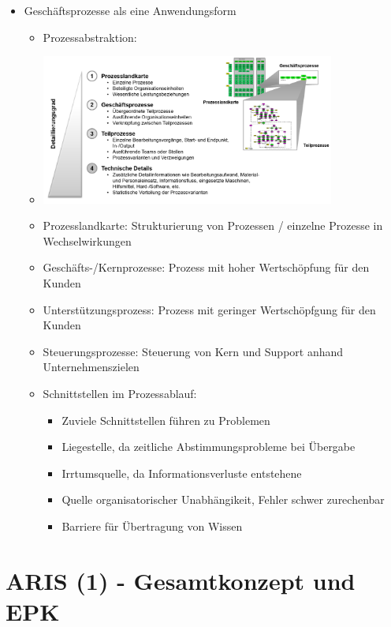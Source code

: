 \documentclass[11pt,a4paper]{article}
\begin{document}
\begin{itemize}
\item Geschäftsprozesse als eine Anwendungsform
	\begin{itemize}
	\item Prozessabstraktion:
	\item[] \includegraphics[width=0.8\textwidth]{Bilder/prozessabstraktion}	
	\item Prozesslandkarte: Strukturierung von Prozessen / einzelne Prozesse in Wechselwirkungen
	\item Geschäfts-/Kernprozesse: Prozess mit hoher Wertschöpfung für den Kunden
	\item Unterstützungsprozess: Prozess mit geringer Wertschöpfgung für den Kunden 
	\item Steuerungsprozesse: Steuerung von Kern und Support anhand Unternehmenszielen
	\item Schnittstellen im Prozessablauf:
		\begin{itemize}
		\item Zuviele Schnittstellen führen zu Problemen
		\item Liegestelle, da zeitliche Abstimmungsprobleme bei Übergabe
		\item Irrtumsquelle, da Informationsverluste entstehene
		\item Quelle organisatorischer Unabhängikeit, Fehler schwer zurechenbar
		\item Barriere für Übertragung von Wissen
		\end{itemize}
	\end{itemize}
\end{itemize}

\section{ARIS (1) - Gesamtkonzept und EPK}
\end{document}
